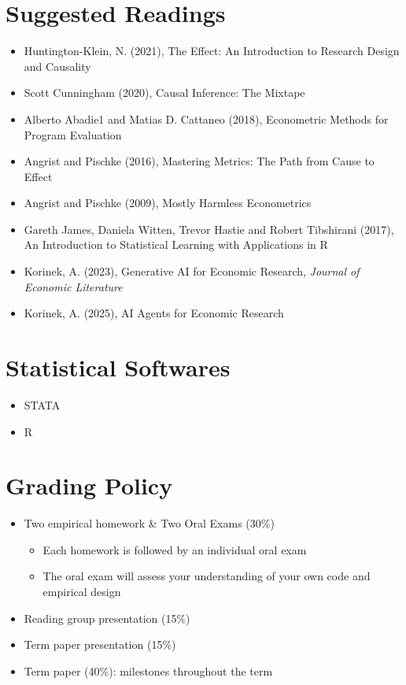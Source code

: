 \documentclass[11pt]{article}
\begin{document}
\section*{Suggested Readings}
\begin{itemize}
\item Huntington-Klein, N. (2021), The Effect: An Introduction to Research Design and Causality
\item Scott Cunningham (2020), Causal Inference: The Mixtape 
\item Alberto Abadie1 and Matias D. Cattaneo (2018), Econometric Methods
for Program Evaluation	
\item Angrist and Pischke (2016), Mastering Metrics: The Path from Cause to Effect
\item Angrist and Pischke (2009), Mostly Harmless Econometrics
\item Gareth James, Daniela Witten, Trevor Hastie and Robert Tibshirani (2017), An Introduction to Statistical Learning with Applications in R
	\item Korinek, A. (2023), Generative AI for Economic Research, \textit{Journal of Economic Literature}
	\item Korinek, A. (2025), AI Agents for Economic Research
\end{itemize} 


\section*{Statistical Softwares}
\begin{itemize}
	\item STATA
	\item R
	
\end{itemize} 



\section*{Grading Policy}
\begin{itemize}
	\item Two empirical homework \& Two Oral Exams (30\%)
	\begin{itemize}
		\item Each homework is followed by an individual oral exam
		\item The oral exam will assess your understanding of your own code and empirical design
	\end{itemize}
	\item Reading group presentation (15\%)
	\item Term paper presentation (15\%)
	\item Term paper (40\%): milestones throughout the term
\end{itemize} 
\end{document}
